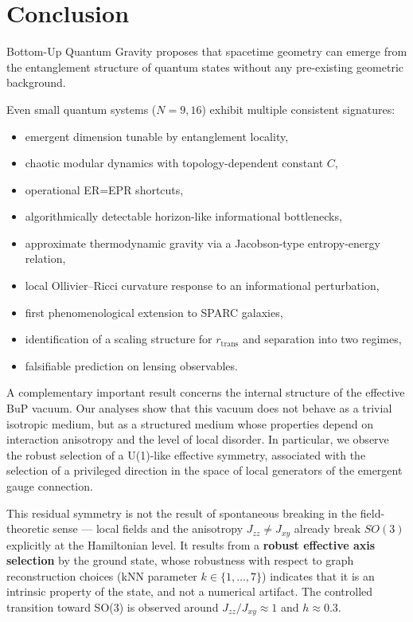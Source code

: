 \documentclass[11pt]{article}
\begin{document}

\section{Conclusion}

Bottom-Up Quantum Gravity proposes that spacetime geometry can emerge
from the entanglement structure of quantum states without any
pre-existing geometric background.

Even small quantum systems ($N=9,16$) exhibit multiple consistent
signatures:

\begin{itemize}
\item emergent dimension tunable by entanglement locality,
\item chaotic modular dynamics with topology-dependent constant $C$,
\item operational ER=EPR shortcuts,
\item algorithmically detectable horizon-like informational bottlenecks,
\item approximate thermodynamic gravity via a Jacobson-type
      entropy-energy relation,
\item local Ollivier--Ricci curvature response to an informational
      perturbation,
\item first phenomenological extension to SPARC galaxies,
\item identification of a scaling structure for $r_{\mathrm{trans}}$
      and separation into two regimes,
\item falsifiable prediction on lensing observables.
\end{itemize}

\bigskip

A complementary important result concerns the internal structure of
the effective BuP vacuum. Our analyses show that this vacuum does not
behave as a trivial isotropic medium, but as a structured medium
whose properties depend on interaction anisotropy and the level of
local disorder. In particular, we observe the robust selection of a
U(1)-like effective symmetry, associated with the selection of a
privileged direction in the space of local generators of the emergent
gauge connection.

This residual symmetry is not the result of spontaneous breaking in
the field-theoretic sense --- local fields and the anisotropy
$J_{zz} \neq J_{xy}$ already break $SO(3)$ explicitly at the
Hamiltonian level. It results from a \textbf{robust effective axis
selection} by the ground state, whose robustness with respect to
graph reconstruction choices (kNN parameter $k \in \{1,\ldots,7\}$)
indicates that it is an intrinsic property of the state, and not a
numerical artifact. The controlled transition toward SO(3) is observed
around $J_{zz}/J_{xy} \approx 1$ and $h \approx 0.3$.
\end{document}

